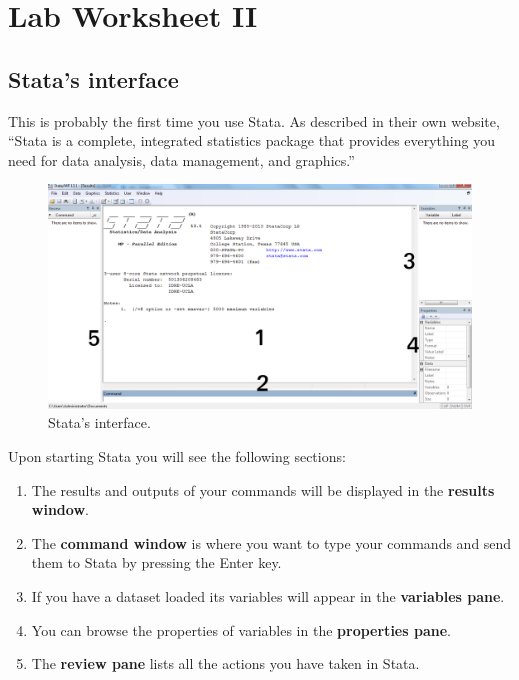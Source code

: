 \documentclass{article}
\begin{document}
\pagestyle{fancy}
\fancyhf{}

\section*{\hfil Lab Worksheet II \hfil}
\subsection*{Stata's interface}

This is probably the first time you use Stata. As described in their own website, ``Stata is a complete, integrated statistics package that provides everything you need for data analysis, data management, and graphics.''

\begin{figure}[H]
	\includegraphics[width=\linewidth]{../img/stata_interface.png}
	\caption{Stata's interface.}
\end{figure}

Upon starting Stata you will see the following sections:

\begin{enumerate}
	\item The results and outputs of your commands will be displayed in the \textbf{results window}.
	\item The \textbf{command window} is where you want to type your commands and send them to Stata by pressing the Enter key.
	\item If you have a dataset loaded its variables will appear in the \textbf{variables pane}.
	\item You can browse the properties of variables in the \textbf{properties pane}.
	\item The \textbf{review pane} lists all the actions you have taken in Stata.  
\end{enumerate}
\end{document}
